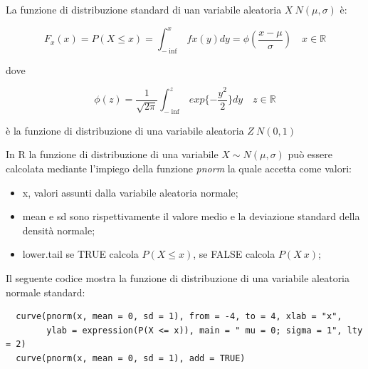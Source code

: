 La funzione di distribuzione standard di uan variabile aleatoria $X ~ N(\mu, \sigma)$ è:

\[F_x(x) = P(X \leq x) = \int_{-\inf}^{x}fx(y)dy = \phi(\frac{x - \mu}{\sigma}) \quad x \in \mathbb{R}\]

dove 

\[\phi(z) = \frac{1}{\sqrt{2\pi}} \int_{-\inf}^z exp\{-\frac{y^2}{2}\}dy \quad z \in \mathbb{R}\]

è la funzione di distribuzione di una variabile aleatoria $Z ~N (0, 1)$

In R la funzione di distribuzione di una variabile $X \sim N(\mu, \sigma)$ può essere calcolata mediante l'impiego della funzione \textit{pnorm} la quale accetta come valori:

\begin{itemize}
    \item x, valori assunti dalla variabile aleatoria normale;
    \item mean e sd sono rispettivamente il valore medio e la deviazione standard della densità normale;
    \item lower.tail se TRUE calcola $P(X\leq x)$, se FALSE calcola $P(X \> x)$;
\end{itemize}

Il seguente codice mostra la funzione di distribuzione di una variabile aleatoria normale standard:

\vspace{5mm}
\begin{lstlisting}
  curve(pnorm(x, mean = 0, sd = 1), from = -4, to = 4, xlab = "x",
        ylab = expression(P(X <= x)), main = " mu = 0; sigma = 1", lty = 2)
  curve(pnorm(x, mean = 0, sd = 1), add = TRUE)
\end{lstlisting}
\vspace{5mm}

